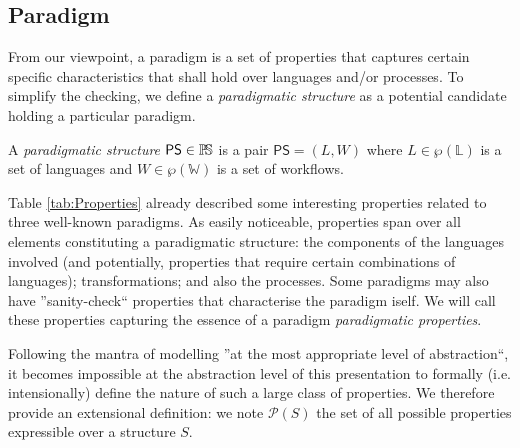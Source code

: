 \subsection{Paradigm}
\label{sec:PS}

From our viewpoint, a paradigm is a set of properties that captures 
certain specific characteristics that shall hold over languages and/or 
processes. To simplify the checking, we define a \emph{paradigmatic structure} 
as a potential candidate holding a particular paradigm.

\begin{Definition}
   A \emph{paradigmatic structure} $\mathsf{PS}\in \mathbb{P}\!\mathbb{S}$ is a pair $\mathsf{PS} 
= (L, W)$ where $L\in \wp(\mathbb{L})$ is a set of languages and 
$W \in \wp(\mathbb{W})$ is a set of workflows.
\end{Definition}

Table \ref{tab:Properties} already described some interesting properties 
related to three well-known paradigms. As easily noticeable, properties span 
over all elements constituting a paradigmatic structure: the components of the 
languages involved (and potentially, properties that require certain 
combinations of languages); transformations; and also the processes. Some 
paradigms may also have ''sanity-check`` properties that characterise the 
paradigm iself. We will call these properties capturing the essence of a 
paradigm \emph{paradigmatic properties}.

Following the mantra of modelling ''at the most appropriate 
level of abstraction``, it becomes impossible at the abstraction level of this 
presentation to formally (i.e. intensionally) define the nature of such a large 
class of properties. We therefore provide an extensional definition: we note 
$\mathcal{P}(S)$ the set of all possible properties expressible over a 
structure $S$. 


